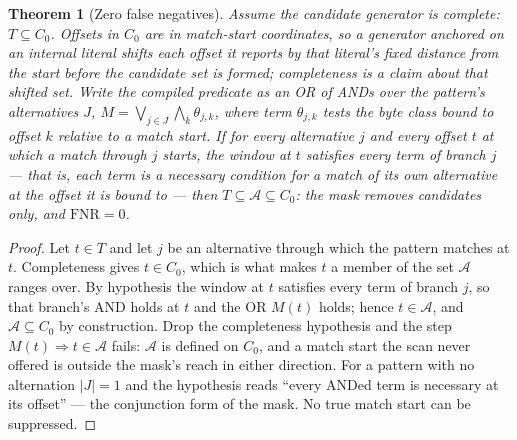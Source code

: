 \documentclass[11pt,letterpaper]{article}
\newtheorem{theorem}{Theorem}
\begin{document}
\begin{theorem}[Zero false negatives]
\label{thm:fnr}
Assume the candidate generator is complete: $T\subseteq C_0$. Offsets in
$C_0$ are in match-start coordinates, so a generator anchored on an internal
literal shifts each offset it reports by that literal's fixed distance from the
start before the candidate set is formed; completeness is a claim about that
shifted set. Write the compiled predicate as an OR of ANDs over the pattern's
alternatives $J$,
$M=\bigvee_{j\in J}\bigwedge_{k}\theta_{j,k}$, where term $\theta_{j,k}$
tests the byte class bound to offset $k$ relative to a match start. If for
every alternative $j$ and every offset $t$ at which a match through $j$
starts, the window at $t$ satisfies every term of branch $j$ --- that is,
each term is a \emph{necessary} condition for a match \emph{of its own
alternative} at the offset it is bound to --- then
$T\subseteq \mathcal{A}\subseteq C_0$: the mask removes candidates only,
and $\mathrm{FNR}=0$.
\end{theorem}

\begin{proof}
Let $t\in T$ and let $j$ be an alternative through which the pattern matches
at $t$. Completeness gives $t\in C_0$, which is what makes $t$ a member of the
set $\mathcal{A}$ ranges over. By hypothesis the window at
$t$ satisfies every term of branch $j$,
so that branch's AND holds at $t$ and the OR $M(t)$ holds; hence
$t\in\mathcal{A}$, and $\mathcal{A}\subseteq C_0$ by construction. Drop the
completeness hypothesis and the step $M(t)\Rightarrow t\in\mathcal{A}$ fails:
$\mathcal{A}$ is defined on $C_0$, and a match start the scan never offered is
outside the mask's reach in either direction. For a
pattern with no alternation $|J|=1$ and the hypothesis reads ``every ANDed
term is necessary at its offset'' --- the conjunction form of the mask. No
true match start can be suppressed.
\end{proof}
\end{document}
